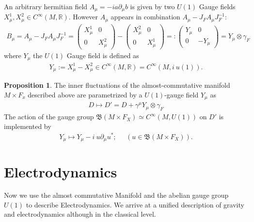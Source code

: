 \documentclass[a4paper]{article}
\theoremstyle{definition}
\theoremstyle{definition}
\theoremstyle{definition}
\theoremstyle{theorem}
\theoremstyle{theorem}
\theoremstyle{theorem}
\newtheorem{proposition}{Proposition}
\begin{document}
    An arbitrary hermitian field $A_\mu = -ia\partial _\mu b$  is given by
    two
    $U(1)$ Gauge fields $X_\mu^1, X_\mu^2 \in C^\infty(M, \mathbb{R})$.
    However $A_\mu$ appears in combination $A_\mu - J_F A_\mu J_F^{-1}$:
    \begin{align}
        B_\mu = A_\mu - J_F A_\mu J_F^{-1} =
        \begin{pmatrix}X_\mu^1&0\\0&X_\mu^2 \end{pmatrix}
            -
        \begin{pmatrix}X_\mu^2&0\\0&X_\mu^1 \end{pmatrix}
            =:
        \begin{pmatrix}Y_\mu&0\\0&-Y_\mu \end{pmatrix}=
            Y_\mu \otimes \gamma _F
    \end{align}
    where $Y_\mu$ the $U(1)$ Gauge field is defined as
    \begin{align}
        Y_\mu := X_\mu^1 - X_\mu^2 \in C^\infty(M, \mathbb{R}) = C^\infty(M,
        i\ u(1)).
    \end{align}

    \begin{proposition}
        The inner fluctuations of the almost-commutative manifold $M\times
        F_x$ described above are parametrized by a $U(1)$-gauge field $Y_\mu$
        as
        \begin{align}
            D \mapsto D' = D + \gamma ^\mu Y_\mu \otimes \gamma_F
        \end{align}
        The action of the gauge group $\mathfrak{B}(M\times F_X) \simeq
        C^\infty (M, U(1))$ on $D'$ is implemented by
        \begin{align}
            Y_\mu \mapsto Y_\mu - i\ u\partial_\mu u^*; \;\;\;\;\; (u\in
            \mathfrak{B}(M\times F_X)).
        \end{align}
    \end{proposition}

\section{Electrodynamics}
Now we use the almost commutative Manifold and the abelian gauge group
$U(1)$ to describe Electrodynamics. We arrive at a unified description of
gravity and electrodynamics although in the classical level.
\newline
\end{document}
